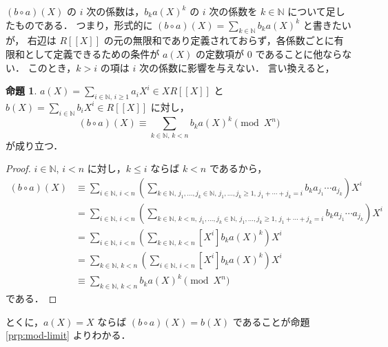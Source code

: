 \documentclass{jsarticle}
\newcommand{\N}{\mathbb{N}}
\theoremstyle{definition}
\newtheorem{Prp}{命題}
\newenvironment{prp}{\vspace{1ex}\begin{screen}\begin{Prp}}{\end{Prp}\end{screen}}
\newenvironment{prf}{\begin{leftbar}\begin{proof}}{\end{proof}\end{leftbar}}
\begin{document}
$(b \circ a)(X)$ の $i$ 次の係数は，$b_k a(X)^k$ の $i$ 次の係数を $k \in \N$ について足したものである．
つまり，形式的に $(b \circ a)(X) = \sum_{k\in\N} b_k a(X)^k$ と書きたいが，
右辺は $R[[X]]$ の元の無限和であり定義されておらず，各係数ごとに有限和として定義できるための条件が $a(X)$ の定数項が $0$ であることに他ならない．
このとき，$k > i$ の項は $i$ 次の係数に影響を与えない．
言い換えると，
\begin{prp}
  \label{prp:composition-mod}
  $a(X) = \sum_{i\in\N,\,i\ge 1} a_i X^i \in X R[[X]]$ と
  $b(X) = \sum_{i\in\N} b_i X^i \in R[[X]]$ に対し，
  \[
    (b \circ a)(X) \equiv \sum_{k\in\N,\,k<n} b_k a(X)^k \pmod{X^n}
  \]
  が成り立つ．
\end{prp}
\begin{prf}
  $i \in \N$, $i < n$ に対し，$k \le i$ ならば $k < n$ であるから，
  \begin{align*}
    (b \circ a)(X)
    &\equiv \sum_{i\in\N,\,i<n} \left(\sum_{k\in\N,\, j_1,\ldots,j_k\in\N,\, j_1,\ldots,j_k\ge 1,\, j_1+\cdots+j_k=i} b_k a_{j_1} \cdots a_{j_k} \right) X^i \\
    &= \sum_{i\in\N,\,i<n} \left(\sum_{k\in\N,\, k<n,\, j_1,\ldots,j_k\in\N,\, j_1,\ldots,j_k\ge 1,\, j_1+\cdots+j_k=i} b_k a_{j_1} \cdots a_{j_k} \right) X^i \\
    &= \sum_{i\in\N,\,i<n} \left( \sum_{k\in\N,\,k<n} [X^i] b_k a(X)^k \right) X^i \\
    &= \sum_{k\in\N,\,k<n} \left( \sum_{i\in\N,\,i<n} [X^i] b_k a(X)^k \right) X^i \\
    &\equiv \sum_{k\in\N,\,k<n} b_k a(X)^k \pmod{X^n}
  \end{align*}
  である．
\end{prf}

とくに，$a(X) = X$ ならば $(b \circ a)(X) = b(X)$ であることが命題 \ref{prp:mod-limit} よりわかる．
\end{document}
